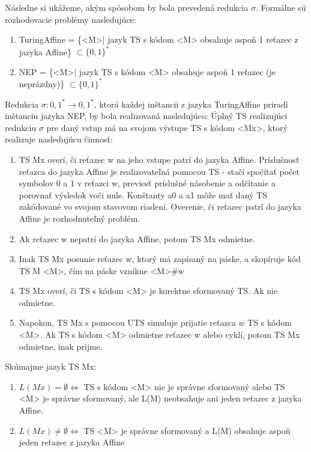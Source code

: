\documentclass[10pt]{article}
\begin{document}
Následne si ukážeme, akým spôsobom by bola prevedená redukcia $\sigma$.
Formálne sú rozhodovacie problémy nasledujúce:
\begin{enumerate}
    \item TuringAffine = \{<M>| jazyk TS s kódom <M> obsahuje aspoň 1 reťazec z jazyka Affine\}
        $\subset \{0,1\}^*$ 
    \item NEP = \{<M>| jazyk TS s kódom <M> obsahuje aspoň 1  reťazec (je neprázdny)\} $\subset \{0,1\}^*$ 
\end{enumerate}

Redukcia $\sigma: {0,1}^* \to {0,1}^*$, ktorá každej inštancii z jazyka TuringAffine priradí
inštanciu jazyka NEP, by bola realizovaná nasledujúco:
Úplný TS realizujúci redukciu $\sigma$ pre daný vstup má na svojom výstupe TS s kódom <Mx>, ktorý
realizuje nasledujúcu činnosť:
\begin{enumerate}
    \item TS Mx overí, či reťazec w na jeho vstupe patrí do jazyka Affine. Príslušnosť reťazca do
        jazyka Affine je realizovateľná pomocou TS - stačí spočítať počet symbolov 0 a 1 v reťazci
        w, previesť príslušné násobenie a odčítanie a porovnať výsledok voči nule. Konštanty
        a0 a a1 môže mať daný TS zakódované vo svojom stavovom riadení. Overenie, či reťazec patrí do jazyka
        Affine je rozhodnuteľný problém. 
    \item Ak reťazec w nepatrí do jazyka Affine, potom TS Mx odmietne.
    \item Inak TS Mx posunie reťazec w, ktorý má zapísaný na páske, a skopíruje kód
        TS M <M>, čím na páske vznikne <M>\#w
    \item TS Mx overí, či TS s kódom <M> je korektne sformovaný TS. Ak nie odmietne.
    \item Napokon, TS Mx s pomocou UTS simuluje prijatie reťazca $w$ TS s kódom <M>. Ak TS s kódom <M>
        odmietne reťazec w alebo cyklí, potom TS Mx odmietne, inak prijme.
\end{enumerate}
Skúmajme jazyk TS Mx:
\begin{enumerate}
    \item $L(Mx) = \emptyset \iff$ TS s kódom <M> nie je správne sformovaný alebo TS <M> je správne
        sformovaný, ale L(M) neobsahuje ani jeden reťazec z jazyka Affine.
    \item $L(Mx) \neq \emptyset \iff$ TS <M> je správne sformovaný a L(M) obsahuje aspoň jeden reťazec
        z jazyka Affine
\end{enumerate}
\end{document}
